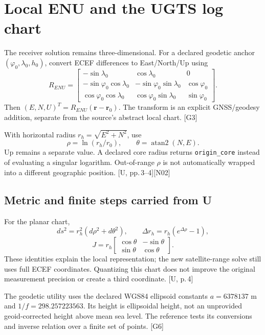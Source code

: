 \documentclass[11pt,a4paper]{article}
\newcommand{\code}[1]{\texttt{#1}}
\newcommand{\src}[1]{\textcolor{muted}{[U, #1]}}
\newcommand{\ext}[1]{\textcolor{muted}{[#1]}}
\newcommand{\dec}[1]{\textcolor{accent}{[N#1]}}
\begin{document}
\section{Local ENU and the UGTS log chart}
The receiver solution remains three-dimensional. For a declared geodetic anchor
$(\varphi_0,\lambda_0,h_0)$, convert ECEF differences to East/North/Up using
\begin{equation}
R_{ENU}=\begin{bmatrix}
-\sin\lambda_0&\cos\lambda_0&0\\
-\sin\varphi_0\cos\lambda_0&-\sin\varphi_0\sin\lambda_0&\cos\varphi_0\\
\cos\varphi_0\cos\lambda_0&\cos\varphi_0\sin\lambda_0&\sin\varphi_0
\end{bmatrix}.
\end{equation}
Then $(E,N,U)^T=R_{ENU}(\boldsymbol r-\boldsymbol r_0)$. The transform is an explicit
GNSS/geodesy addition, separate from the source's abstract local chart. \ext{G3}

With horizontal radius $r_h=\sqrt{E^2+N^2}$, use
\begin{equation}
\rho=\ln(r_h/r_0),\qquad\theta=\operatorname{atan2}(N,E).
\end{equation}
Up remains a separate value. A declared core radius returns \code{origin\_core}
instead of evaluating a singular logarithm. Out-of-range $\rho$ is not automatically
wrapped into a different geographic position. \src{pp.\,3--4}\dec{02}

\subsection{Metric and finite steps carried from U}
For the planar chart,
\begin{equation}
ds^2=r_h^2(d\rho^2+d\theta^2),\qquad
\Delta r_h=r_h(e^{\Delta\rho}-1),
\end{equation}
\begin{equation}
J=r_h\begin{bmatrix}\cos\theta&-\sin\theta\\\sin\theta&\cos\theta\end{bmatrix}.
\end{equation}
These identities explain the local representation; the new satellite-range solve
still uses full ECEF coordinates. Quantizing this chart does not improve the original
measurement precision or create a third coordinate. \src{p.\,4}

The geodetic utility uses the declared WGS84 ellipsoid constants $a=6378137$ m and
$1/f=298.257223563$. Its height is ellipsoidal height, not an unprovided geoid-corrected
height above mean sea level. The reference tests its conversions and inverse relation
over a finite set of points. \ext{G6}
\clearpage
\end{document}
